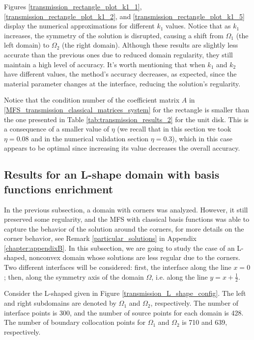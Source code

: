 Figures \ref{transmission_rectangle_plot_k1_1}, \ref{transmission_rectangle_plot_k1_2}, and \ref{transmission_rectangle_plot_k1_5} display the numerical approximations for different \(k_1\) values. Notice that as \(k_1\) increases, the symmetry of the solution is disrupted, causing a shift from \(\Omega_1\) (the left domain) to \(\Omega_2\) (the right domain). Although these results are slightly less accurate than the previous ones due to reduced domain regularity, they still maintain a high level of accuracy. It's worth mentioning that when \(k_1\) and \(k_2\) have different values, the method's accuracy decreases, as expected, since the material parameter changes at the interface, reducing the solution's regularity.

Notice that the condition number of the coefficient matrix \(A\) in \eqref{MFS_transmission_classical_matrices_system} for the rectangle is smaller than the one presented in Table \ref{tab:transmission_results_2} for the unit disk. This is a consequence of a smaller value of \(\eta\) (we recall that in this section we took \(\eta=0.08\) and in the numerical validation section \(\eta=0.3\)), which in this case appears to be optimal since increasing its value decreases the overall accuracy.

\subsection{Results for an L-shape domain with basis functions enrichment}

In the previous subsection, a domain with corners was analyzed. However, it still preserved some regularity, and the \ac{MFS} with classical basis functions was able to capture the behavior of the solution around the corners, for more details on the corner behavior, see Remark \ref{particular_solutions} in Appendix \ref{chapter:appendixB}. In this subsection, we are going to study the case of an L-shaped, nonconvex domain whose solutions are less regular due to the corners. Two different interfaces will be considered: first, the interface along the line \(x=0\); then, along the symmetry axis of the domain \(\Omega\), i.e. along the line \(y=x+\frac{1}{2}\).

Consider the L-shaped given in Figure \ref{transmission_L_shape_config}. The left and right subdomains are denoted by \(\Omega_1\) and \(\Omega_2\), respectively. The number of interface points is 300, and the number of source points for each domain is 428. The number of boundary collocation points for \(\Omega_1\) and \(\Omega_2\) is 710 and 639, respectively.

